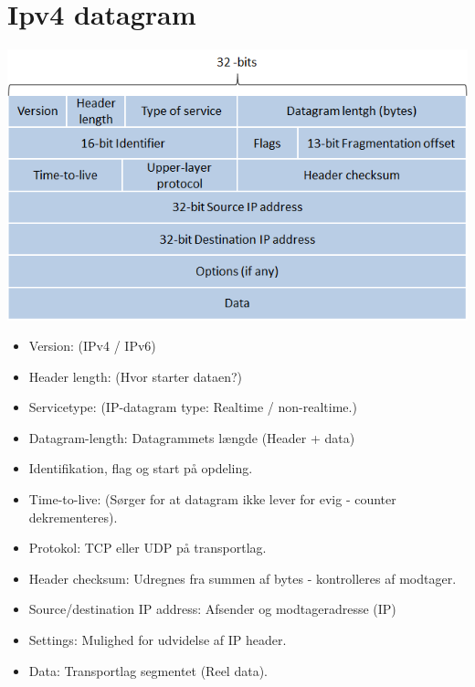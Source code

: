 {{{{\section{Ipv4 datagram}
{\includegraphics{4-network-layer/IPv4_datagram.png}
\begin{itemize}
	\item Version: (IPv4 / IPv6)
	\item Header length: (Hvor starter dataen?)
	\item Servicetype: (IP-datagram type: Realtime / non-realtime.)
	\item Datagram-length: Datagrammets længde (Header + data)
	\item Identifikation, flag og start på opdeling.
	\item Time-to-live: (Sørger for at datagram ikke lever for evig - counter dekrementeres).
	\item Protokol: TCP eller UDP på transportlag.
	\item Header checksum: Udregnes fra summen af bytes - kontrolleres af modtager.
	\item Source/destination IP address: Afsender og modtageradresse (IP)
	\item Settings: Mulighed for udvidelse af IP header.
	\item Data: Transportlag segmentet (Reel data).
\end{itemize}

}}}}}
